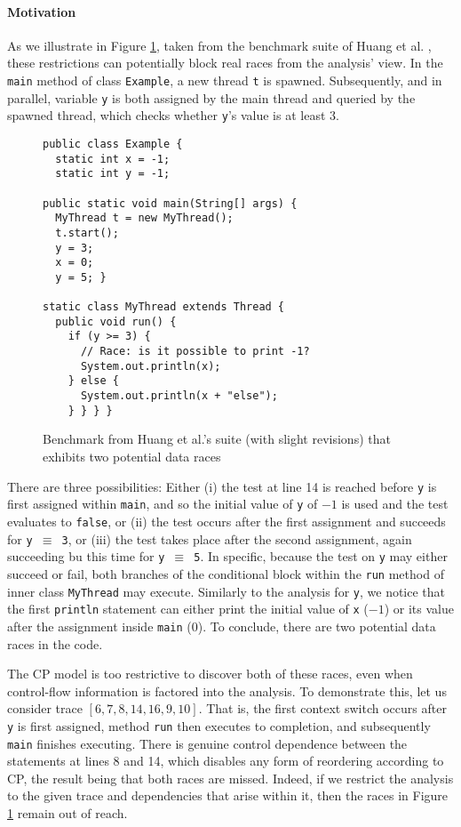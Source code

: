 \paragraph{Motivation} As we illustrate in Figure \ref{Fi:illustrative}, taken from the benchmark suite of Huang et al. \cite{XXX}, these restrictions can potentially block real races from the analysis' view. In 
the {\tt main} method of class {\tt Example}, a new thread {\tt t} is spawned. Subsequently, and in parallel, variable {\tt y} is both assigned by the main thread and queried by the spawned thread, which checks whether {\tt y}'s value is at least $3$.

\begin{figure}
\begin{lstlisting}
public class Example {
  static int x = -1;
  static int y = -1;

public static void main(String[] args) {
  MyThread t = new MyThread();
  t.start();
  y = 3;
  x = 0;
  y = 5; }

static class MyThread extends Thread {
  public void run() {
    if (y >= 3) {
      // Race: is it possible to print -1? 
      System.out.println(x);
    } else {
      System.out.println(x + "else");	
    } } } }
\end{lstlisting}
\caption{\label{Fi:illustrative}Benchmark from Huang et al.'s suite \cite{XXX} (with slight revisions) that exhibits two potential data races}
\end{figure}

There are three possibilities: Either (i) the test at line 14 is reached before {\tt y} is first assigned within {\tt main}, and so the initial value of {\tt y} of $-1$ is used and the test evaluates to {\tt false}, or (ii) the test occurs after the first assignment and succeeds for {\tt y $\equiv$ 3}, or (iii) the test takes place after the second assignment, again succeeding bu this time for {\tt y $\equiv$ 5}. In specific, because the test on {\tt y} may either succeed or fail, both branches of the conditional block within the {\tt run} method of inner class {\tt MyThread} may execute. Similarly to the analysis for {\tt y}, we notice that the first {\tt println} statement can either print the initial value of {\tt x} ($-1$) or its value after the assignment inside {\tt main} ($0$). To conclude, there are two potential data races in the code.

The CP model is too restrictive to discover both of these races, even when control-flow information is factored into the analysis. To demonstrate this, let us consider trace $\left[ 6,7,8,14,16,9,10 \right]$. That is, the first context switch occurs after {\tt y} is first assigned, method {\tt run} then executes to completion, and subsequently {\tt main} finishes executing. There is genuine control dependence between the statements at lines 8 and 14, which disables any form of reordering according to CP, the result being that both races are missed. Indeed, if we restrict the analysis to the given trace and dependencies that arise within it, then the races in Figure \ref{Fi:illustrative} remain out of reach.

